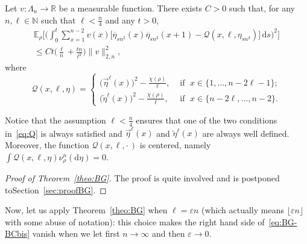 \documentclass[AHL,Unicode,longabstracts]{cedram}
\newcommand{\bb}[1]{{\mathbb #1}}
\newcommand{\mc}[1]{{\mathcal #1}}
\renewcommand{\mc}[1]{{\mathcal #1}}
\renewcommand\vec[1]{\overrightarrow{#1}}
\newcommand\vecleft[1]{\overleftarrow{#1}}
\renewcommand{\bar}{\overline}
\renewcommand{\leq}{\leqslant}
\newcommand*{\dd}{\mathrm{d}}
\newcommand*{\ds}{\dd s}
\begin{document}
\begin{theo}\label{theo:BG}
Let $v:\Lambda_n\to\bb R$ be a measurable function. There exists $C>0$ such that, for any $n,\ell\in\bb N$ such that $\ell < \frac n 4$ and any $t>0$,
\begin{multline}\label{eq:BG-BCbis}
\bb E_\rho\bigg[\bigg(\int_0^t \sum_{x=1}^{n-2} v(x) \Big[\bar\eta_{sn^2}(x)\bar\eta_{sn^2}(x+1) - \mc Q(x,\ell,\eta_{sn^2})\Big] \,\ds\bigg)^2\bigg]\\ \leq Ct \Big(\frac{\ell}{n} + \frac{tn}{\ell^2}\Big) \|v\|^2_{2,n},
\end{multline}
where
\begin{equation}\label{eq:Q}
\mc Q(x,\ell,\eta)=
\begin{cases}
\displaystyle \big(\vec\eta^\ell(x)\big)^2 - \frac{\chi(\rho)}{\ell}, &\text{ if }\; x \in\{1, \dots, n-2\ell-1\}; \\[0.65em]
\displaystyle \big(\vecleft\eta^\ell(x)\big)^2 - \frac{\chi(\rho)}{\ell}, & \text{ if }\; x\in\{ n-2\ell, \dots, n-2\}.
\end{cases}
\end{equation}
\end{theo}

\begin{rema}
Notice that the assumption $\ell < \frac n 4$ ensures that one of the two conditions in~\eqref{eq:Q} is always satisfied and $\vec\eta^\ell(x)$ and $\vecleft\eta^\ell(x)$ are always well defined. Moreover, the function $\mc Q(x,\ell,\cdot\,)$ is centered, namely $\int \mc Q(x,\ell,\eta)\nu_\rho^n(\dd\eta)= 0$.
\end{rema}

\begin{proof}[Proof of Theorem~\ref{theo:BG}]
The proof is quite involved and is postponed to\linebreak Section~\ref{sec:proofBG}.
\end{proof}

Now, let us apply Theorem~\ref{theo:BG} when $\ell=\varepsilon n$ (which actually means $\lfloor \varepsilon n \rfloor$ with some abuse of notation): this choice makes the right hand side of~\eqref{eq:BG-BCbis} vanish when we let first $n\to \infty$ and then $\varepsilon \to 0$.
\end{document}
